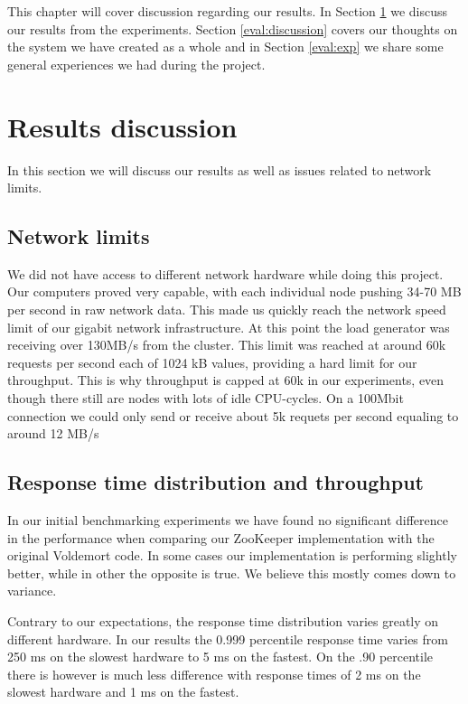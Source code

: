 This chapter will cover discussion regarding our results. In Section \ref{eval:results} we discuss our results from the experiments. Section \ref{eval:discussion} covers our thoughts on the system we have created as a whole and in Section \ref{eval:exp} we share some general experiences we had during the project.

\section{Results discussion}
\label{eval:results}
In this section we will discuss our results as well as issues related to network limits.  

\subsection{Network limits}
We did not have access to different network hardware while doing this project. Our computers proved very capable, with each individual node pushing 34-70 MB per second in raw network data. This made us quickly reach the network speed limit of our gigabit network infrastructure. At this point the load generator was receiving over 130MB/s from the cluster. This limit was reached at around 60k requests per second each of 1024 kB values, providing a hard limit for our throughput. This is why throughput is capped at 60k in our experiments, even though there still are nodes with lots of idle CPU-cycles. On a 100Mbit connection we could only send or receive about 5k requets per second equaling to around 12 MB/s

\subsection{Response time distribution and throughput}
\label{eval:performance}
In our initial benchmarking experiments we have found no significant difference in the performance when comparing our ZooKeeper implementation with the original Voldemort code. In some cases our implementation is performing slightly better, while in other the opposite is true. We believe this mostly comes down to variance.

Contrary to our expectations, the response time distribution varies greatly on different hardware. In our results the 0.999 percentile response time varies from 250 ms on the slowest hardware to 5 ms on the fastest. On the .90 percentile there is however is much less difference with response times of 2 ms on the slowest hardware and 1 ms on the fastest.

